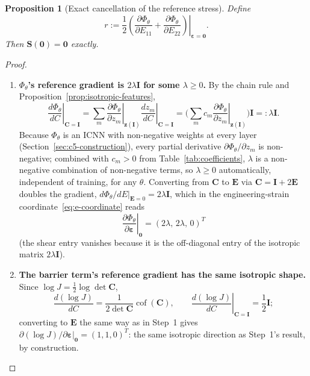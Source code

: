 \documentclass[10pt,a4paper]{article}
\newtheorem{proposition}{Proposition}
\newcommand{\Cof}{\operatorname{cof}}
\begin{document}
\begin{proposition}[Exact cancellation of the reference stress]
\label{prop:cancellation}
Define
\begin{equation}
 r:=\frac12\left.\left(\frac{\partial\Phi_\theta}{\partial E_{11}}+
 \frac{\partial\Phi_\theta}{\partial E_{22}}\right)\right|_{\bm\varepsilon=\bm0}.
 \label{eq:pressure-cancellation}
\end{equation}
Then $\bm S(\bm0)=\bm0$ exactly.
\end{proposition}
\begin{proof}
\begin{enumerate}
\item \textbf{$\Phi_\theta$'s reference gradient is $2\lambda \bm I$ for
some $\lambda\geq0$.} By the chain rule and
Proposition~\ref{prop:isotropic-features},
\begin{equation}
 \left.\frac{d\Phi_\theta}{dC}\right|_{\bm C=\bm I}
 =\sum_m\left.\frac{\partial\Phi_\theta}{\partial z_m}\right|_{\bm z(\bm I)}
 \left.\frac{dz_m}{dC}\right|_{\bm C=\bm I}
 =\Big(\sum_mc_m\left.\frac{\partial\Phi_\theta}{\partial z_m}\right|_{\bm z(\bm I)}\Big)\bm I
 =:\lambda \bm I .
 \label{eq:lambda}
\end{equation}
Because $\Phi_\theta$ is an ICNN with non-negative weights at every
layer (Section~\ref{sec:c5-construction}), every partial derivative
$\partial\Phi_\theta/\partial z_m$ is non-negative; combined with
$c_m>0$ from Table~\ref{tab:coefficients}, $\lambda$ is a non-negative
combination of non-negative terms, so $\lambda\geq0$ automatically,
independent of training, for any $\theta$. Converting from $\bm C$ to $\bm E$
via $\bm C=\bm I+2\bm E$ doubles the gradient, $d\Phi_\theta/dE|_{\bm E=0}=2\lambda \bm I$,
which in the engineering-strain coordinate~\eqref{eq:e-coordinate} reads
\begin{equation}
 \left.\frac{\partial\Phi_\theta}{\partial\bm\varepsilon}\right|_{\bm0}
 =(2\lambda,\,2\lambda,\,0)^T
\end{equation}
(the shear entry vanishes because it is the off-diagonal entry of the
isotropic matrix $2\lambda \bm I$).

\item \textbf{The barrier term's reference gradient has the same
isotropic shape.} Since $\log J=\tfrac12\log\det \bm C$,
\begin{equation}
 \frac{d(\log J)}{dC}=\frac{1}{2\det \bm C}\Cof(\bm C),
 \qquad
 \left.\frac{d(\log J)}{dC}\right|_{\bm C=\bm I}=\frac12\bm I;
\end{equation}
converting to $\bm E$ the same way as in Step~1 gives
$\partial(\log J)/\partial\bm\varepsilon|_{\bm0}=(1,1,0)^T$: the
same isotropic direction as Step~1's result, by construction.


\end{enumerate}
\end{proof}
\end{document}

